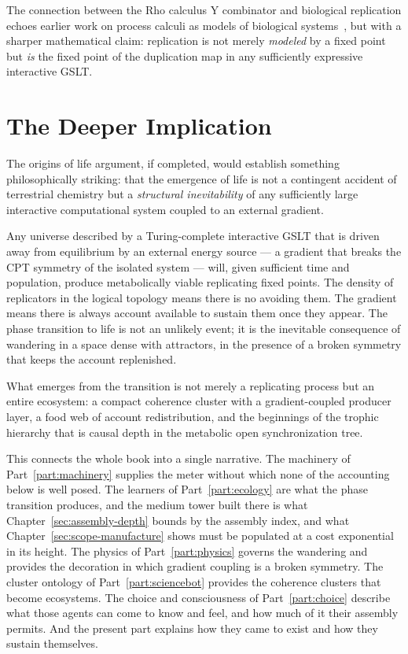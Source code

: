 The connection between the Rho calculus Y combinator and
biological replication echoes earlier work on process calculi
as models of biological systems~\cite{regev2001representation},
but with a sharper mathematical claim: replication is not merely
\emph{modeled} by a fixed point but \emph{is} the fixed point
of the duplication map in any sufficiently expressive interactive
GSLT.

\section{The Deeper Implication}

The origins of life argument, if completed, would establish
something philosophically striking: that the emergence of life
is not a contingent accident of terrestrial chemistry but a
\emph{structural inevitability} of any sufficiently large
interactive computational system coupled to an external gradient.

Any universe described by a Turing-complete interactive GSLT
that is driven away from equilibrium by an external energy source
--- a gradient that breaks the CPT symmetry of the isolated
system --- will, given sufficient time and population, produce
metabolically viable replicating fixed points.
The density of replicators in the logical topology means there is
no avoiding them.
The gradient means there is always account available to sustain
them once they appear.
The phase transition to life is not an unlikely event; it is
the inevitable consequence of wandering in a space dense with
attractors, in the presence of a broken symmetry that keeps
the account replenished.

What emerges from the transition is not merely a replicating
process but an entire ecosystem: a compact coherence cluster
with a gradient-coupled producer layer, a food web of account
redistribution, and the beginnings of the trophic hierarchy
that is causal depth in the metabolic open synchronization tree.

This connects the whole book into a single narrative.
The machinery of Part~\ref{part:machinery} supplies the meter without
which none of the accounting below is well posed.
The learners of Part~\ref{part:ecology} are what the phase transition
produces, and the medium tower built there is what
Chapter~\ref{sec:assembly-depth} bounds by the assembly index, and what
Chapter~\ref{sec:scope-manufacture} shows must be populated at a cost
exponential in its height.
The physics of Part~\ref{part:physics} governs the wandering and
provides the decoration in which gradient coupling is a broken symmetry.
The cluster ontology of Part~\ref{part:sciencebot} provides the
coherence clusters that become ecosystems.
The choice and consciousness of Part~\ref{part:choice} describe what
those agents can come to know and feel, and how much of it their
assembly permits.
And the present part explains how they came to exist and how they sustain
themselves.


